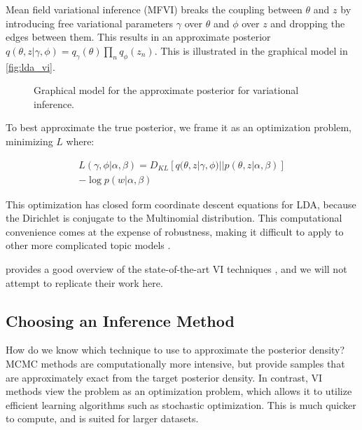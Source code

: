 \documentclass[letterpaper]{article}
\begin{document}
Mean field variational inference (MFVI) breaks the coupling between
$\theta$ and $z$ by introducing free variational parameters $\gamma$
over $\theta$ and $\phi$ over $z$ and dropping the edges between them.
This results in an approximate posterior $q(\theta, z | \gamma, \phi)
= q_\gamma(\theta)\prod_nq_\phi(z_n)$. This is illustrated in the
graphical model in \autoref{fig:lda_vi}.

\begin{figure}[ht]
  \centering
  \caption{\label{fig:lda_vi} Graphical model for the approximate
    posterior for variational inference.}
\end{figure}

To best approximate the true posterior, we frame it as an optimization
problem, minimizing $L$ where:

\begin{multline}
L(\gamma, \phi | \alpha, \beta) = D_{KL}\left[ q(\theta, z | \gamma,
  \phi) || p(\theta, z | \alpha, \beta) \right] \\
- \log p(w | \alpha, \beta)
\end{multline}

This optimization has closed form coordinate descent equations for
LDA, because the Dirichlet is conjugate to the Multinomial
distribution. This computational convenience comes at the expense of
robustness, making it difficult to apply to other more complicated
topic models \cite{blei2003latent}.

\citeauthor{DBLP:journals/corr/abs-1711-05597} provides a good
overview of the state-of-the-art VI techniques
\cite{DBLP:journals/corr/abs-1711-05597}, and we will not attempt to
replicate their work here.

\subsection{Choosing an Inference Method}
\label{sub:choosing-inference}
How do we know which technique to use to approximate the posterior
density? MCMC methods are computationally more intensive, but provide
samples that are approximately exact from the target posterior
density. In contrast, VI methods view the problem as an optimization
problem, which allows it to utilize efficient learning algorithms such
as stochastic optimization. This is much quicker to compute, and is
suited for larger datasets.
\end{document}
